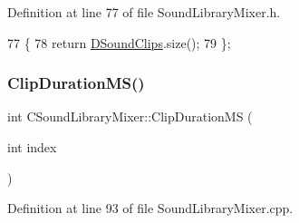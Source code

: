 Definition at line 77 of file Sound\+Library\+Mixer.\+h.


\begin{DoxyCode}
77                              \{
78             \textcolor{keywordflow}{return} \hyperlink{classCSoundLibraryMixer_af4a006eacdcd590fad6e02cddaf197c2}{DSoundClips}.size();  
79         \};
\end{DoxyCode}
\hypertarget{classCSoundLibraryMixer_a0492c587cb62cd8945880a7de3dad490}{}\label{classCSoundLibraryMixer_a0492c587cb62cd8945880a7de3dad490} 
\subsubsection{\texorpdfstring{Clip\+Duration\+M\+S()}{ClipDurationMS()}}
{\footnotesize\ttfamily int C\+Sound\+Library\+Mixer\+::\+Clip\+Duration\+MS (\begin{DoxyParamCaption}\item[{int}]{index }\end{DoxyParamCaption})}



Definition at line 93 of file Sound\+Library\+Mixer.\+cpp.


